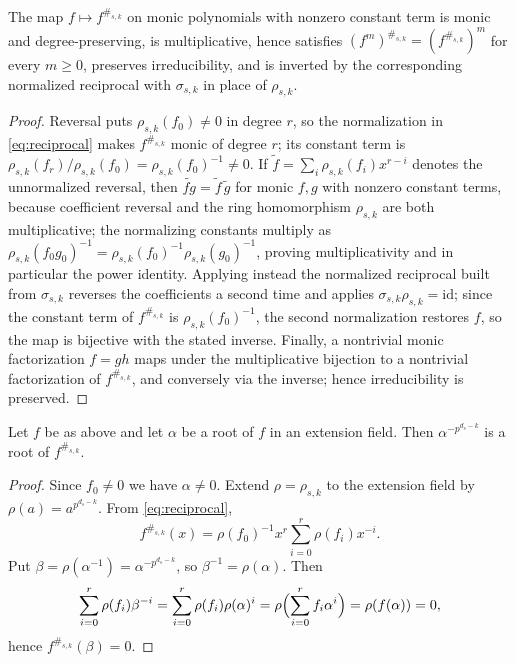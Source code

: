 \begin{lemma}\label{lem:reciprocal}
The map $f\mapsto f^{\#_{s,k}}$ on monic polynomials with nonzero constant term
is monic and degree-preserving, is multiplicative, hence satisfies
$(f^m)^{\#_{s,k}}=(f^{\#_{s,k}})^m$ for every $m\geq0$, preserves
irreducibility, and is inverted by the corresponding normalized reciprocal with
$\sigma_{s,k}$ in place of $\rho_{s,k}$.
\end{lemma}

\begin{proof}
Reversal puts $\rho_{s,k}(f_0)\neq0$ in degree $r$, so the normalization in
\eqref{eq:reciprocal} makes $f^{\#_{s,k}}$ monic of degree $r$; its constant
term is $\rho_{s,k}(f_r)/\rho_{s,k}(f_0)=\rho_{s,k}(f_0)^{-1}\neq0$.  If
$\widetilde{f}=\sum_i\rho_{s,k}(f_i)x^{r-i}$ denotes the unnormalized reversal,
then $\widetilde{fg}=\widetilde{f}\,\widetilde{g}$ for monic $f,g$ with nonzero
constant terms, because coefficient reversal and the ring homomorphism
$\rho_{s,k}$ are both multiplicative; the normalizing constants multiply as
$\rho_{s,k}(f_0g_0)^{-1}=\rho_{s,k}(f_0)^{-1}\rho_{s,k}(g_0)^{-1}$, proving
multiplicativity and in particular the power identity.  Applying instead the
normalized reciprocal built from $\sigma_{s,k}$ reverses the coefficients a
second time and applies $\sigma_{s,k}\rho_{s,k}=\mathrm{id}$; since the constant
term of $f^{\#_{s,k}}$ is $\rho_{s,k}(f_0)^{-1}$, the second normalization
restores $f$, so the map is bijective with the stated inverse.  Finally, a
nontrivial monic factorization $f=gh$ maps under the multiplicative bijection
to a nontrivial factorization of $f^{\#_{s,k}}$, and conversely via the inverse;
hence irreducibility is preserved.
\end{proof}

\begin{lemma}\label{lem:root-action}
Let $f$ be as above and let $\alpha$ be a root of $f$ in an extension field.
Then $\alpha^{-p^{d_s-k}}$ is a root of $f^{\#_{s,k}}$.
\end{lemma}

\begin{proof}
Since $f_0\neq0$ we have $\alpha\neq0$.  Extend $\rho=\rho_{s,k}$ to the
extension field by $\rho(a)=a^{p^{d_s-k}}$.  From \eqref{eq:reciprocal},
\[
f^{\#_{s,k}}(x)=\rho(f_0)^{-1}x^r\sum_{i=0}^{r}\rho(f_i)x^{-i}.
\]
Put $\beta=\rho(\alpha^{-1})=\alpha^{-p^{d_s-k}}$, so
$\beta^{-1}=\rho(\alpha)$.  Then
{\small
\[
\sum_{i=0}^{r}\rho(f_i)\beta^{-i}
   =\sum_{i=0}^{r}\rho(f_i)\rho(\alpha)^i
   =\rho\Bigl(\sum_{i=0}^{r}f_i\alpha^i\Bigr)=\rho(f(\alpha))=0,
\]
}
hence $f^{\#_{s,k}}(\beta)=0$.
\end{proof}

